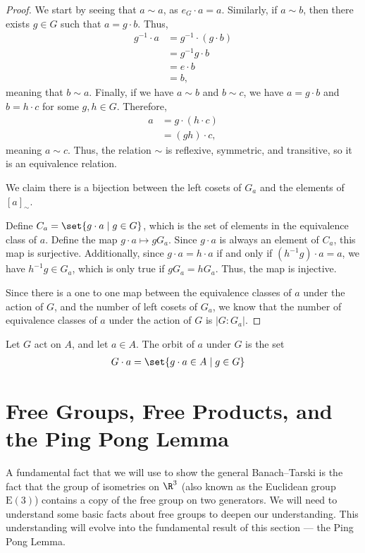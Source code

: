 \begin{proof}
  We start by seeing that $a\sim a$, as $e_G\cdot a = a$. Similarly, if $a\sim b$, then there exists $g\in G$ such that $a = g\cdot b$. Thus,
  \begin{align*}
    g^{-1}\cdot a &= g^{-1}\cdot \left(g\cdot b\right)\\
                  &= g^{-1}g\cdot b\\
                  &= e\cdot b\\
                  &= b,
  \end{align*}
  meaning that $b\sim a$. Finally, if we have $a\sim b$ and $b\sim c$, we have $a = g\cdot b$ and $b = h\cdot c$ for some $g,h\in G$. Therefore,
  \begin{align*}
    a &= g\cdot \left(h\cdot c\right)\\
      &= \left(gh\right)\cdot c,
  \end{align*}
  meaning $a\sim c$. Thus, the relation $\sim$ is reflexive, symmetric, and transitive, so it is an equivalence relation.\newline

  We claim there is a bijection between the left cosets of $G_a$ and the elements of $\left[a\right]_{\sim}$.\newline

  Define $C_a = \set{g\cdot a\mid g\in G}$, which is the set of elements in the equivalence class of $a$. Define the map $g\cdot a \mapsto gG_a$. Since $g\cdot a$ is always an element of $C_a$, this map is surjective. Additionally, since $g\cdot a = h\cdot a$ if and only if $\left(h^{-1}g\right)\cdot a = a$, we have $h^{-1}g \in G_a$, which is only true if $gG_a = hG_a$. Thus, the map is injective.\newline

  Since there is a one to one map between the equivalence classes of $a$ under the action of $G$, and the number of left cosets of $G_a$, we know that the number of equivalence classes of $a$ under the action of $G$ is $\left\vert G:G_a \right\vert$.
\end{proof}
\begin{definition}[Orbit]
  Let $G$ act on $A$, and let $a\in A$. The {orbit} of $a$ under $G$ is the set
\begin{align*}
  G\cdot a &= \set{g\cdot a\in A\mid g\in G}
\end{align*}
\end{definition}
\section{Free Groups, Free Products, and the Ping Pong Lemma}%
A fundamental fact that we will use to show the general Banach--Tarski is the fact that the group of isometries on $\R^3$ (also known as the Euclidean group $\text{E}(3)$) contains a copy of the free group on two generators. We will need to understand some basic facts about free groups to deepen our understanding. This understanding will evolve into the fundamental result of this section --- the Ping Pong Lemma.
